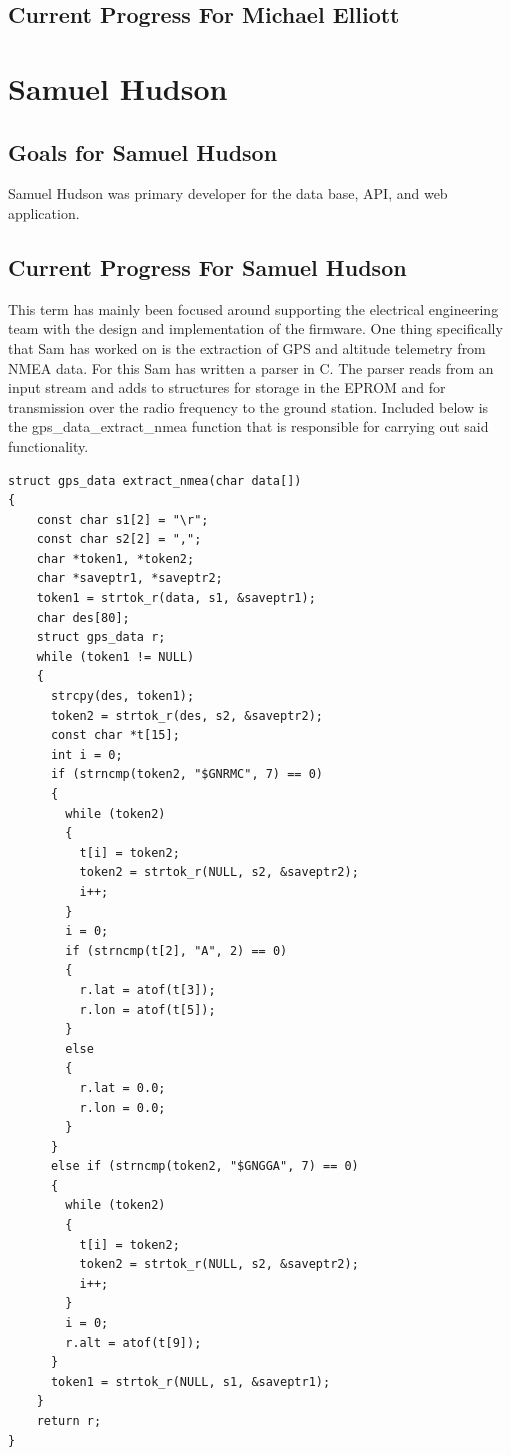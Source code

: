 \documentclass[onecolumn, draftclsnofoot,10pt, compsoc]{IEEEtran}
\begin{document}
\subsection {Current Progress For Michael Elliott} 
\section {Samuel Hudson} 
\subsection{Goals for Samuel Hudson}
Samuel Hudson was primary developer for the data base, API, and web application. 
\subsection {Current Progress For Samuel Hudson} 
This term has mainly been focused around supporting the electrical engineering team with the design and implementation of the firmware. One thing specifically that Sam has worked on is the extraction of GPS and altitude telemetry from NMEA data. For this Sam has written a parser in C. The parser reads from an input stream and adds to structures for storage in the EPROM and for transmission over the radio frequency to the ground station. Included below is the gps\_data\_extract\_nmea function that is responsible for carrying out said functionality.
\begin{lstlisting}
struct gps_data extract_nmea(char data[])
{
    const char s1[2] = "\r";
    const char s2[2] = ",";
    char *token1, *token2;
    char *saveptr1, *saveptr2;
    token1 = strtok_r(data, s1, &saveptr1);
    char des[80];
    struct gps_data r;
    while (token1 != NULL)
    {
      strcpy(des, token1);
      token2 = strtok_r(des, s2, &saveptr2);
      const char *t[15];
      int i = 0;
      if (strncmp(token2, "$GNRMC", 7) == 0)
      {
        while (token2)
        {
          t[i] = token2;
          token2 = strtok_r(NULL, s2, &saveptr2);
          i++;
        }
        i = 0;
        if (strncmp(t[2], "A", 2) == 0)
        {
          r.lat = atof(t[3]);
          r.lon = atof(t[5]);
        }
        else
        {
          r.lat = 0.0;
          r.lon = 0.0;
        }
      }
      else if (strncmp(token2, "$GNGGA", 7) == 0)
      {
        while (token2)
        {
          t[i] = token2;
          token2 = strtok_r(NULL, s2, &saveptr2);
          i++;
        }
        i = 0;
        r.alt = atof(t[9]);
      }
      token1 = strtok_r(NULL, s1, &saveptr1);
    }
    return r;
}
\end{lstlisting}
\end{document}
